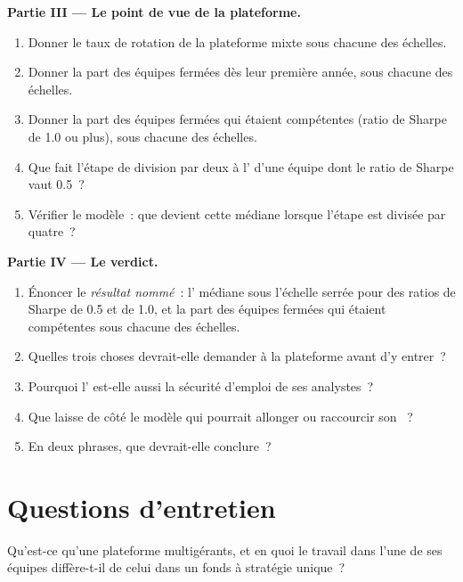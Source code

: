 \begin{problem}
\medskip\noindent\textbf{Partie III --- Le point de vue de la plateforme.}
\begin{enumerate}[resume]
\item Donner le taux de rotation de la plateforme mixte sous chacune des échelles.
\item Donner la part des équipes fermées dès leur première année, sous chacune des échelles.
\item Donner la part des équipes fermées qui étaient compétentes (ratio de Sharpe de 1.0 ou plus), sous chacune des échelles.
\item Que fait l'étape de division par deux à l' d'une équipe dont le ratio de Sharpe vaut 0.5~?
\item Vérifier le modèle~: que devient cette médiane lorsque l'étape est divisée par quatre~?
\end{enumerate}

\medskip\noindent\textbf{Partie IV --- Le verdict.}
\begin{enumerate}[resume]
\item Énoncer le \emph{résultat nommé}~: l' médiane sous l'échelle serrée pour des ratios de Sharpe de 0.5 et de 1.0, et la
part des équipes fermées qui étaient compétentes sous chacune des échelles.
\item Quelles trois choses devrait-elle demander à la plateforme avant d'y entrer~?
\item Pourquoi l' est-elle aussi la sécurité d'emploi de ses analystes~?
\item Que laisse de côté le modèle qui pourrait allonger ou raccourcir son ~?
\item En deux phrases, que devrait-elle conclure~?
\end{enumerate}
\end{problem}

\section{Questions d'entretien}

\begin{interviewq}\label{iq:in:multi-manager-platforms:1}
Qu'est-ce qu'une plateforme multigérants, et en quoi le travail dans l'une de ses équipes diffère-t-il
de celui dans un fonds à stratégie unique~?
\end{interviewq}

